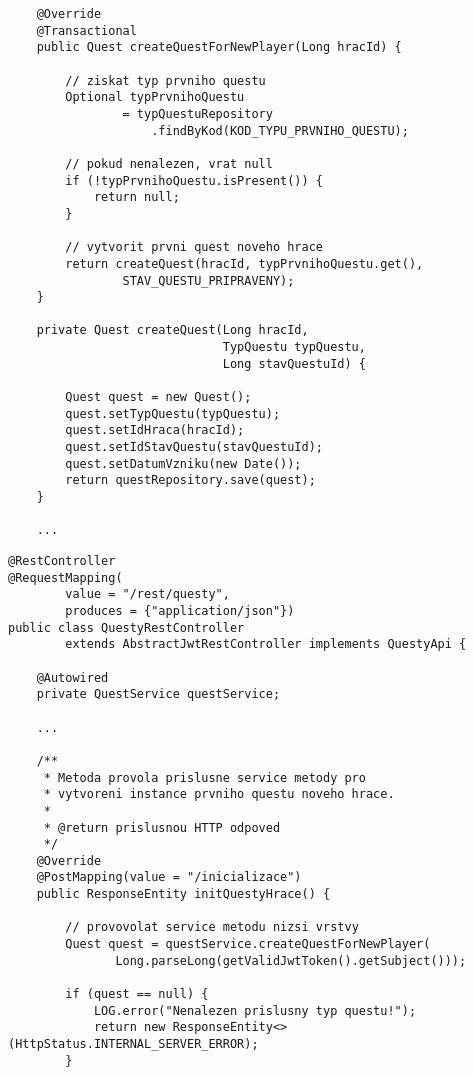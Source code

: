 \documentclass[twoside, 12pt]{article}
\begin{document}
{{\begin{lstlisting}
    @Override
    @Transactional
    public Quest createQuestForNewPlayer(Long hracId) {

        // ziskat typ prvniho questu
        Optional typPrvnihoQuestu
                = typQuestuRepository
                    .findByKod(KOD_TYPU_PRVNIHO_QUESTU);

        // pokud nenalezen, vrat null
        if (!typPrvnihoQuestu.isPresent()) {
            return null;
        }

        // vytvorit prvni quest noveho hrace
        return createQuest(hracId, typPrvnihoQuestu.get(),
                STAV_QUESTU_PRIPRAVENY);
    }

    private Quest createQuest(Long hracId,
                              TypQuestu typQuestu,
                              Long stavQuestuId) {

        Quest quest = new Quest();
        quest.setTypQuestu(typQuestu);
        quest.setIdHraca(hracId);
        quest.setIdStavQuestu(stavQuestuId);
        quest.setDatumVzniku(new Date());
        return questRepository.save(quest);
    }

    ...

\end{lstlisting}

\clearpage


\begin{lstlisting}
@RestController
@RequestMapping(
        value = "/rest/questy",
        produces = {"application/json"})
public class QuestyRestController
        extends AbstractJwtRestController implements QuestyApi {

    @Autowired
    private QuestService questService;

    ...

    /**
     * Metoda provola prislusne service metody pro
     * vytvoreni instance prvniho questu noveho hrace.
     *
     * @return prislusnou HTTP odpoved
     */
    @Override
    @PostMapping(value = "/inicializace")
    public ResponseEntity initQuestyHrace() {

        // provovolat service metodu nizsi vrstvy
        Quest quest = questService.createQuestForNewPlayer(
               Long.parseLong(getValidJwtToken().getSubject()));

        if (quest == null) {
            LOG.error("Nenalezen prislusny typ questu!");
            return new ResponseEntity<>(HttpStatus.INTERNAL_SERVER_ERROR);
        }


\end{lstlisting}}}
\end{document}

